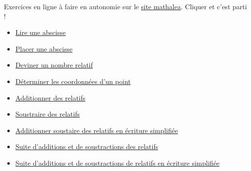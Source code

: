 \begin{mathalea}[][\mathaleaLogo]
    Exercices en ligne à faire en autonomie sur le \href{https://coopmaths.fr/mathalea.html}{site mathalea}. 
    Cliquer et c'est parti !
    \begin{itemize}
        \item \href{https://coopmaths.fr/mathalea.html?ex=5R11,s=1,n=3,i=1&v=l}{Lire une abscisse}
        \item \href{https://coopmaths.fr/mathalea.html?ex=5R11-2,s=1,n=3,i=1&v=l}{Placer une abscisse}
        \item \href{https://coopmaths.fr/mathalea.html?ex=5R10-1,n=3&v=l}{Deviner un nombre relatif}        
        \item \href{https://coopmaths.fr/mathalea.html?ex=5R12-2,s=1,s2=true&v=l}{Déterminer les coordonnées d'un point}
        \item \href{https://coopmaths.fr/mathalea.html?ex=5R20,s=20,s2=false,s3=false,n=5,i=1&v=l}{Additionner des relatifs}
        \item \href{https://coopmaths.fr/mathalea.html?ex=5R21,s=20,s2=false,n=5,cd=1,i=1&v=l}{Soustraire des relatifs}
        \item \href{https://coopmaths.fr/mathalea.html?ex=5R20,s=20,s2=true,s3=false,n=5,i=1&v=l}{Additionner soustaire des relatifs en écriture simplifiée}
        \item \href{https://coopmaths.fr/mathalea.html?ex=5R22,s=20,s2=false,n=3,i=1&v=l}{Suite d'additions et de soustractions des relatifs}
        \item \href{https://coopmaths.fr/mathalea.html?ex=5R22,s=20,s2=true,n=3,i=1&v=l}{Suite d'additions et de soustractions de relatifs en écriture simplifiée}
    \end{itemize}
\end{mathalea}
